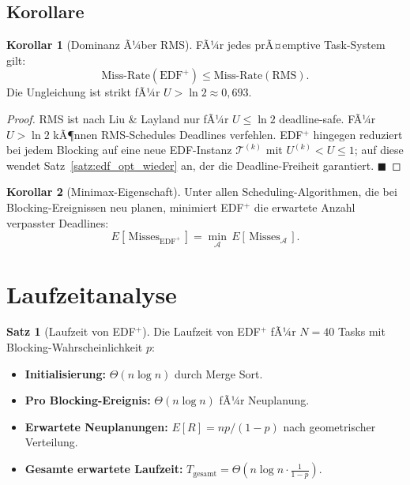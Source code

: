 ﻿\documentclass[a4paper,12pt]{report}
\theoremstyle{definition}
\newtheorem{satz}{Satz}[chapter]
\newtheorem{korollar}{Korollar}[chapter]
\begin{document}
\subsection{Korollare}

\begin{korollar}[Dominanz Ã¼ber RMS]
	FÃ¼r jedes prÃ¤emptive Task-System gilt:
	\[
		\text{Miss-Rate}(\text{EDF}^+) \leq \text{Miss-Rate}(\text{RMS}).
	\]
	Die Ungleichung ist strikt fÃ¼r $U > \ln 2 \approx 0{,}693$.
\end{korollar}

\begin{proof}
	RMS ist nach Liu \& Layland \cite{Liu1973} nur fÃ¼r $U \leq \ln 2$
	deadline-safe. FÃ¼r $U > \ln 2$ kÃ¶nnen RMS-Schedules Deadlines verfehlen.
	EDF$^+$ hingegen reduziert bei jedem Blocking auf eine neue EDF-Instanz
	$\mathcal{T}^{(k)}$ mit $U^{(k)} < U \leq 1$; auf diese wendet
	Satz~\ref{satz:edf_opt_wieder} an, der die Deadline-Freiheit garantiert.
	\hfill$\blacksquare$
\end{proof}

\begin{korollar}[Minimax-Eigenschaft]
	Unter allen Scheduling-Algorithmen, die bei Blocking-Ereignissen neu planen,
	minimiert EDF$^+$ die erwartete Anzahl verpasster Deadlines:
	\[
		E[\,\text{Misses}_{\text{EDF}^+}\,] = \min_{\mathcal{A}} \,E[\,\text{Misses}_{\mathcal{A}}\,].
	\]
\end{korollar}

\section{Laufzeitanalyse}

\begin{satz}[Laufzeit von EDF$^+$]
	Die Laufzeit von EDF$^+$ fÃ¼r $N = 40$ Tasks mit Blocking-Wahrscheinlichkeit $p$:
	\begin{itemize}
		\item \textbf{Initialisierung:} $\Theta(n \log n)$ durch Merge Sort.
		\item \textbf{Pro Blocking-Ereignis:} $\Theta(n \log n)$ fÃ¼r Neuplanung.
		\item \textbf{Erwartete Neuplanungen:} $E[R] = np/(1-p)$ nach geometrischer Verteilung.
		\item \textbf{Gesamte erwartete Laufzeit:}
		      $T_{\text{gesamt}} = \Theta\!\left(n \log n \cdot \frac{1}{1-p}\right)$.
	\end{itemize}
\end{satz}
\end{document}
